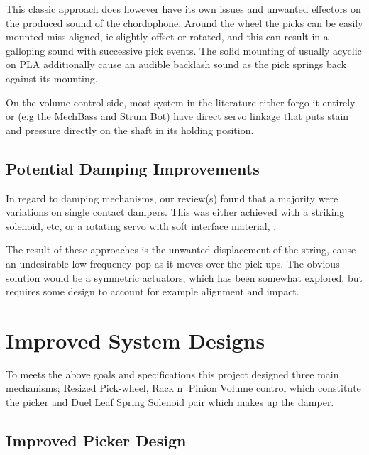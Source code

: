 \documentclass[a4paper,11pt]{article}
\begin{document}
This classic approach does however have its own issues and unwanted effectors on the produced sound of the chordophone. 
Around the wheel the picks can be easily mounted miss-aligned, ie slightly offset or rotated, and this can result in a galloping sound with successive pick events. The solid mounting of usually acyclic on PLA additionally cause an audible backlash sound as the pick springs back against its mounting.

On the volume control side, most system in the literature either forgo it entirely or (e.g the MechBass and Strum Bot) have direct servo linkage that puts stain and pressure directly on the shaft in its holding position.

\subsection{Potential Damping Improvements}

In regard to damping mechanisms, our review(s) found that a majority were variations on single contact dampers. This was either achieved with a striking solenoid, \cite{vibe_harp} etc, or a rotating servo with soft interface material, \cite{hammer}.

The result of these approaches is the unwanted displacement of the string, cause an undesirable low frequency pop as it moves over the pick-ups. The obvious solution would be a symmetric actuators, which has been somewhat explored, but requires some design to account for example alignment and impact.

\section{Improved System Designs}

To meets the above goals and specifications this project designed three main mechanisms; Resized Pick-wheel, Rack n' Pinion Volume control which constitute the picker and Duel Leaf Spring Solenoid pair which makes up the damper.

\subsection{Improved Picker Design}
\end{document}

